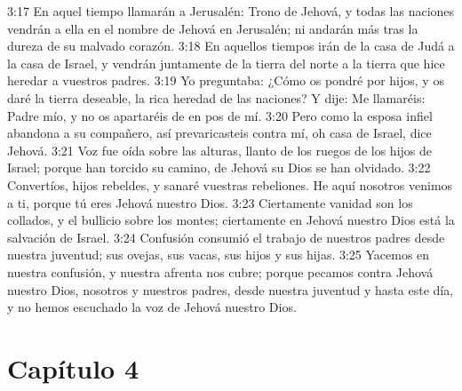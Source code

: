 3:17 En aquel tiempo llamarán a Jerusalén: Trono de Jehová, y todas las naciones vendrán a ella en el nombre de Jehová en Jerusalén; ni andarán más tras la dureza de su malvado corazón. 
3:18 En aquellos tiempos irán de la casa de Judá a la casa de Israel, y vendrán juntamente de la tierra del norte a la tierra que hice heredar a vuestros padres. 
3:19 Yo preguntaba: ¿Cómo os pondré por hijos, y os daré la tierra deseable, la rica heredad de las naciones? Y dije: Me llamaréis: Padre mío, y no os apartaréis de en pos de mí. 
3:20 Pero como la esposa infiel abandona a su compañero, así prevaricasteis contra mí, oh casa de Israel, dice Jehová. 
3:21 Voz fue oída sobre las alturas, llanto de los ruegos de los hijos de Israel; porque han torcido su camino, de Jehová su Dios se han olvidado. 
3:22 Convertíos, hijos rebeldes, y sanaré vuestras rebeliones. He aquí nosotros venimos a ti, porque tú eres Jehová nuestro Dios. 
3:23 Ciertamente vanidad son los collados, y el bullicio sobre los montes; ciertamente en Jehová nuestro Dios está la salvación de Israel. 
3:24 Confusión consumió el trabajo de nuestros padres desde nuestra juventud; sus ovejas, sus vacas, sus hijos y sus hijas. 
3:25 Yacemos en nuestra confusión, y nuestra afrenta nos cubre; porque pecamos contra Jehová nuestro Dios, nosotros y nuestros padres, desde nuestra juventud y hasta este día, y no hemos escuchado la voz de Jehová nuestro Dios. 
\section*{Capítulo 4 }
 
